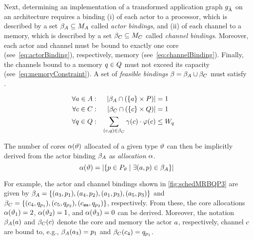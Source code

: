 Next, determining an implementation of a transformed application graph $g_{\tilde{\textrm{A}}}$ on an architecture requires a binding (i) of each actor to a processor, which is described by a set $\beta_A \subseteq M_A$ called \emph{actor bindings}, and (ii) of each channel to a memory, which is described by a set $\beta_C \subseteq M_C$ called \emph{channel bindings}.
Moreover, each actor and channel must be bound to exactly one core (see~\cref{eq:actorBinding}), respectively, memory (see~\cref{eq:channelBinding}).
Finally, the channels bound to a memory $q \in Q$ must not exceed its capacity (see~\cref{eq:memoryConstraint}).
A set of \emph{feasible bindings} $\beta = \beta_A \cup \beta_C$ must satisfy .
\par
\begin{align}
  \forall \actor \in \SetActors     &:& | \SetBindingsActors \cap (\{\actor\} \times \SetCores)|& = 1&  \label{eq:actorBinding}\\
  \forall \channel \in \SetChannels &:& | \SetBindingsChannels \cap (\{\channel\} \times \SetMemories)|& = 1& \label{eq:channelBinding}\\
  \forall \memory \in \SetMemories  &:& \sum_{(\channel,\memory) \in \SetBindingsChannels} \Capacity(\channel) \cdot \Size(\channel) &\leq \MemoryCapacity{\memory}& \label{eq:memoryConstraint}
\end{align}
\par
The number of cores $\alpha(\vartheta)$ allocated of a given type $\vartheta$ can then be implicitly derived from the actor binding $\beta_A$ as \emph{allocation} $\alpha$.
\begin{equation}
  \alpha(\vartheta) = |\{ p \in P_\vartheta \mid \exists (a, p) \in \beta_A \}|
\end{equation}
\par
For example, the actor and channel bindings shown in \cref{fig:schedMRBQP3} are given by $\beta_A = \{(a_3,p_1), (a_4,p_2), (a_1,p_3), (a_5,p_3)\}$ and $\SetBindingsChannels = \{(\channel_4,\memory_{\core_1}), (\channel_5,\memory_{\core_2}), (\GenMRB,\memory_{\core_3})\}$, respectively.
From these, the core allocations $\alpha(\vartheta_1) = 2$, $\alpha(\vartheta_2) = 1$, and $\alpha(\vartheta_3) = 0$ can be derived.
Moreover, the notation $\beta_A(a)$ and $\beta_C(c)$ denote the core and memory the actor $a$, respectively, channel $c$ are bound to, e.g., $\beta_A(a_3) = p_1$ and $\beta_C(c_4) = q_{p_1}$.
